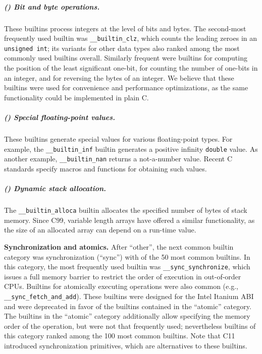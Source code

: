 \documentclass[sigconf,screen]{acmart}
\renewcommand{\paragraph}[1]{\textbf{#1}}
\newcommand\code[1]{\texttt{#1}}
\newcommand{\RNum}[1]{\uppercase\expandafter{\romannumeral #1\relax}}
\begin{document}
\subparagraph{(\RNum{2}) Bit and byte operations.}
These builtins process integers at the level of bits and bytes.
The second-most frequently used builtin was \code{\_\_builtin\_clz}, which counts the leading zeroes in an \code{unsigned int}; its variants for other data types also ranked among the most commonly used builtins overall.
Similarly frequent were builtins for computing the position of the least significant one-bit, for counting the number of one-bits in an integer, and for reversing the bytes of an integer.
We believe that these builtins were used for convenience and performance optimizations, as the same functionality could be implemented in plain C.

\subparagraph{(\RNum{3}) Special floating-point values.}
These builtins generate special values for various floating-point types.
For example, the \code{\_\_builtin\_inf} builtin generates a positive infinity \code{double} value.
As another example, \code{\_\_builtin\_nan} returns a not-a-number value.
Recent C standards specify macros and functions for obtaining such values.

\subparagraph{(\RNum{4}) Dynamic stack allocation.}
The \code{\_\_builtin\_alloca} builtin allocates the specified number of bytes of stack memory.
Since C99, variable length arrays have offered a similar functionality, as the size of an allocated array can depend on a run-time value.


\paragraph{Synchronization and atomics.}
After ``other'', the next common builtin category was synchronization (``sync'') with \topSyncBuiltins{} of the 50 most common builtins.
In this category, the most frequently used builtin was \code{\_\_sync\_synchronize}, which issues a full memory barrier to restrict the order of execution in out-of-order CPUs.
Builtins for atomically executing operations were also common (e.g., \code{\_\_sync\_fetch\_and\_add}).
These builtins were designed for the Intel Itanium ABI and were deprecated in favor of the builtins contained in the ``atomic'' category.
The builtins in the ``atomic'' category additionally allow specifying the memory order of the operation, but were not that frequently used; nevertheless \topAtomicBuiltins{} builtins of this category ranked among the 100 most common builtins.
Note that C11 introduced synchronization primitives, which are alternatives to these builtins.
\end{document}
